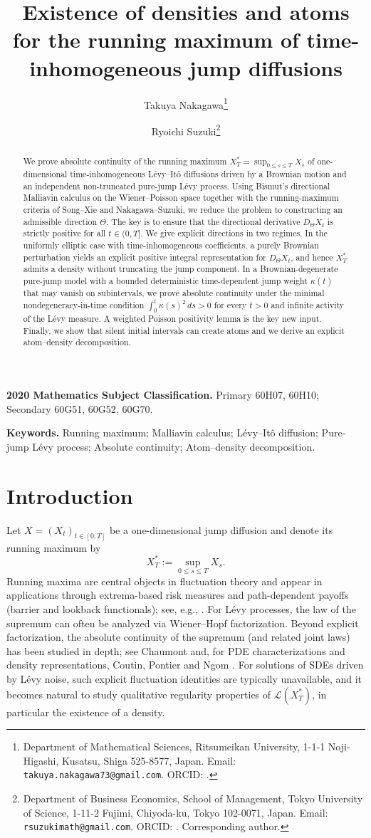 \documentclass[11pt]{article}
\title{Existence of densities and atoms for the running maximum of time-inhomogeneous jump diffusions}
\author{Takuya Nakagawa\thanks{Department of Mathematical Sciences,
Ritsumeikan University, 1-1-1 Noji-Higashi, Kusatsu, Shiga 525-8577, Japan.
Email: \texttt{takuya.nakagawa73@gmail.com}.
ORCID: \orcid{0000-0003-1216-4822}.}
\and
Ryoichi Suzuki\thanks{Department of Business Economics, School of Management,
Tokyo University of Science, 1-11-2 Fujimi, Chiyoda-ku, Tokyo 102-0071, Japan.
Email: \texttt{rsuzukimath@gmail.com}.
ORCID: \orcid{0000-0001-9979-1882}.
Corresponding author.}
}
\date{}
\newcommand{\1}{\mathbf{1}}
\newcommand{\law}{\mathcal{L}}
\newcommand{\Xstar}{X^{\ast}}
\theoremstyle{plain}
\theoremstyle{definition}
\theoremstyle{remark}
\begin{document}
\maketitle

\begin{abstract}
We prove absolute continuity of the running maximum $\Xstar_T=\sup_{0\le s\le T}X_s$ of one-dimensional time-inhomogeneous L\'evy--It\^o diffusions driven by a Brownian motion and an independent non-truncated pure-jump L\'evy process.
Using Bismut's directional Malliavin calculus on the Wiener--Poisson space together with the running-maximum criteria of Song--Xie and Nakagawa--Suzuki, we reduce the problem to constructing an admissible direction $\Theta$.
The key is to ensure that the directional derivative $D_\Theta X_t$ is strictly positive for all $t\in(0,T]$.
We give explicit directions in two regimes.
In the uniformly elliptic case with time-inhomogeneous coefficients, a purely Brownian perturbation yields an explicit positive integral representation for $D_\Theta X_t$, and hence $\Xstar_T$ admits a density without truncating the jump component.
In a Brownian-degenerate pure-jump model with a bounded deterministic time-dependent jump weight $\kappa(t)$ that may vanish on subintervals, we prove absolute continuity under the minimal nondegeneracy-in-time condition $\int_0^t \kappa(s)^2\,ds>0$ for every $t>0$ and infinite activity of the L\'evy measure.
A weighted Poisson positivity lemma is the key new input.
Finally, we show that silent initial intervals can create atoms and we derive an explicit atom--density decomposition.
\end{abstract}
\medskip
\noindent\textbf{2020 Mathematics Subject Classification.} Primary 60H07, 60H10; Secondary 60G51, 60G52, 60G70.

\noindent\textbf{Keywords.} Running maximum; Malliavin calculus; L\'evy--It\^o diffusion; Pure-jump L\'evy process; Absolute continuity; Atom--density decomposition.


\section{Introduction}

Let $X=(X_t)_{t\in[0,T]}$ be a one-dimensional jump diffusion and denote its running maximum by
\[
\Xstar_T := \sup_{0\le s\le T} X_s.
\]
Running maxima are central objects in fluctuation theory and appear in applications through extrema-based risk measures and
path-dependent payoffs (barrier and lookback functionals); see, e.g., \cite{Bertoin1996,ContTankov2004,Kyprianou2014}.
For L\'evy processes, the law of the supremum can often be analyzed via Wiener--Hopf factorization.
Beyond explicit factorization, the absolute continuity of the supremum (and related joint laws) has been studied in depth; see Chaumont \cite{Chaumont2013} and, for PDE characterizations and density representations, Coutin, Pontier and Ngom \cite{CoutinPontierNgom2018}.
For solutions of SDEs driven by L\'evy noise, such explicit fluctuation identities are typically unavailable,
and it becomes natural to study qualitative regularity properties of $\law(\Xstar_T)$, in particular the existence of a density.
\end{document}
